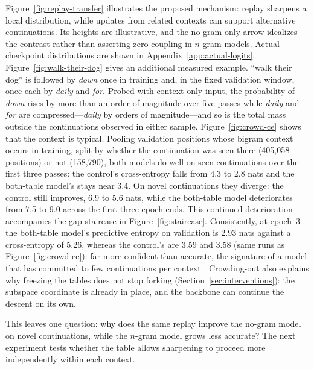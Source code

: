 Figure~\ref{fig:replay-transfer} illustrates the proposed mechanism: replay sharpens a local distribution, while updates from related contexts can support alternative continuations. Its heights are illustrative, and the no-gram-only arrow idealizes the contrast rather than asserting zero coupling in $n$-gram models. Actual checkpoint distributions are shown in Appendix~\ref{app:actual-logits}. Figure~\ref{fig:walk-their-dog} gives an additional measured example. ``walk their dog'' is followed by \emph{down} once in training and, in the fixed validation window, once each by \emph{daily} and \emph{for}. Probed with context-only input, the probability of \emph{down} rises by more than an order of magnitude over five passes while \emph{daily} and \emph{for} are compressed---\emph{daily} by orders of magnitude---and so is the total mass outside the continuations observed in either sample. Figure~\ref{fig:crowd-ce} shows that the context is typical. Pooling validation positions whose bigram context occurs in training, split by whether the continuation was seen there (405{,}058 positions) or not (158{,}790), both models do well on seen continuations over the first three passes: the control's cross-entropy falls from 4.3 to 2.8 nats and the both-table model's stays near 3.4. On novel continuations they diverge: the control still improves, 6.9 to 5.6 nats, while the both-table model deteriorates from 7.5 to 9.0 across the first three epoch ends. This continued deterioration accompanies the gap staircase in Figure~\ref{fig:staircase}. Consistently, at epoch~3 the both-table model's predictive entropy on validation is 2.93 nats against a cross-entropy of 5.26, whereas the control's are 3.59 and 3.58 (same runs as Figure~\ref{fig:crowd-ce}): far more confident than accurate, the signature of a model that has committed to few continuations per context \citep{carlsson2025hyperfitting}. Crowding-out also explains why freezing the tables does not stop forking (Section~\ref{sec:interventions}): the subspace coordinate is already in place, and the backbone can continue the descent on its own.

This leaves one question: why does the same replay improve the no-gram model on novel continuations, while the $n$-gram model grows less accurate? The next experiment tests whether the table allows sharpening to proceed more independently within each context.

\FloatBarrier
